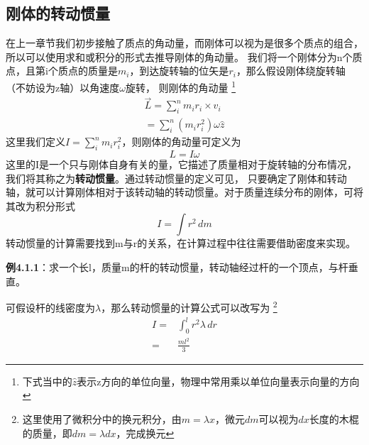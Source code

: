 \documentclass{article}
\begin{document}
    \subsection{刚体的转动惯量}
    在上一章节我们初步接触了质点的角动量，而刚体可以视为是很多个质点的组合，所以可以使用求和或积分的形式去推导刚体的角动量。
    我们将一个刚体分为n个质点，且第i个质点的质量是\(m_i\)，到达旋转轴的位矢是\(r_i\)，那么假设刚体绕旋转轴（不妨设为z轴）以角速度\(\omega\)旋转，
    则刚体的角动量
    \footnote{下式当中的\(\hat{z}\)表示z方向的单位向量，物理中常用乘以单位向量表示向量的方向}
    \begin{align*}
        \vec{L} = \sum_i^n m_i r_i \times v_i \\
                = \sum_i^n (m_i r_i^2) \omega \hat{z}
    \end{align*}
    这里我们定义\(I =\displaystyle \sum_i^n m_i r_i^2\)，则刚体的角动量可定义为
    \begin{equation*}
        L = I \omega
    \end{equation*}
    这里的I是一个只与刚体自身有关的量，它描述了质量相对于旋转轴的分布情况，我们将其称之为\textbf{转动惯量}。通过转动惯量的定义可见，
    只要确定了刚体和转动轴，就可以计算刚体相对于该转动轴的转动惯量。对于质量连续分布的刚体，可将其改为积分形式
    \begin{equation*}
        I = \int r^2 \, dm
    \end{equation*}
    转动惯量的计算需要找到m与r的关系，在计算过程中往往需要借助密度来实现。

    \textbf{例4.1.1}：求一个长l，质量m的杆的转动惯量，转动轴经过杆的一个顶点，与杆垂直。

    可假设杆的线密度为\(\lambda\)，那么转动惯量的计算公式可以改写为
    \footnote{这里使用了微积分中的换元积分，由\(m=\lambda x\)，微元\(dm\)可以视为\(dx\)长度的木棍的质量，即\(dm = \lambda dx\)，完成换元}
    \begin{align*}
        I =& \int_0^l r^2 \lambda \, dr \\
          =& \frac{ml^2}{3}
    \end{align*}
\end{document}
